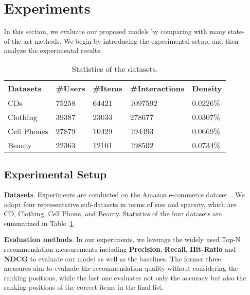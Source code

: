 \documentclass[algorithms,article,accept,moreauthors,pdftex,10pt,a4paper]{Definitions/mdpi}
\begin{document}
\iffalse
\section{Experiments}
In this section, we evaluate our proposed models by comparing with many state-of-the-art methods. We begin by introducing the experimental setup, and then analyze the experimental results.

\begin{table}[!b]
	\centering
	\vspace{-10pt}
	\caption{Statistics of the datasets.}
	\vspace{-10pt}
	\begin{tabular}{p{2cm}<{\centering}|p{0.8cm}<{\centering}|p{0.8cm}<{\centering}|p{1.6cm}<{\centering}|p{1cm}<{\centering}}
		\hline\hline
		Datasets               &\#Users   &\#Items&\#Interactions &Density \\ \hline
		{CDs}&75258&64421&1097592&0.0226\%\\\hline
		{Clothing}&39387&23033&278677&0.0307\% \\\hline
		{Cell Phones}&27879&10429&194493&0.0669\% \\\hline
		{Beauty}&22363&12101&198502&0.0734\% \\\hline
	\end{tabular}
	\label{tb-dataset}
\end{table}



\subsection{Experimental Setup}\label{set}

\noindent
\textbf{Datasets}. Experiments are conducted on the Amazon e-commerce dataset~\cite{he2016ups}. We adopt four representative sub-datasets in terms of size and sparsity, which are CD, Clothing, Cell Phone, and Beauty. Statistics of the four datasets are summarized in Table~\ref{tb-dataset}.


\noindent
\textbf{Evaluation methods}. In our experiments, we leverage the widely used Top-N recommendation measurements including \textbf{Precision}, \textbf{Recall}, \textbf{Hit-Ratio} and \textbf{NDCG} to evaluate our model as well as the baselines. The former three measures aim to evaluate the recommendation quality without considering the ranking positions, while the last one evaluates not only the accuracy but also the ranking positions of the correct items in the final list.
\end{document}
